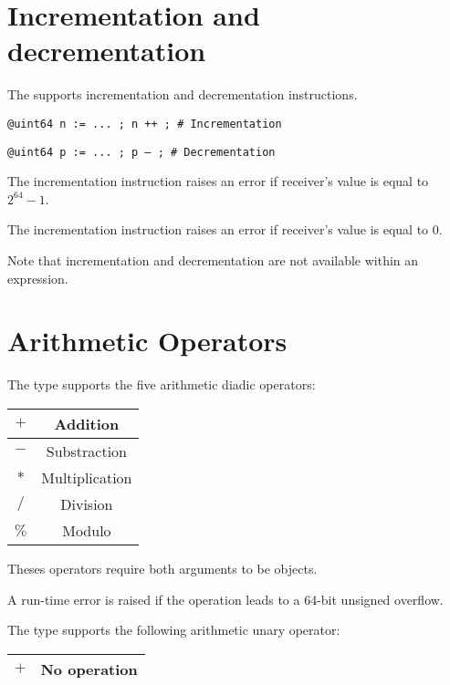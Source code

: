 \section{Incrementation and decrementation}

The  supports incrementation and decrementation instructions.

\texttt{@uint64 n := ... ; n ++ ; \# Incrementation}

\texttt{@uint64 p := ... ; p -- ; \# Decrementation}\newline

The incrementation instruction raises an error if receiver's value is equal to $2^{64}-1$.\newline

The incrementation instruction raises an error if receiver's value is equal to 0.\newline

Note that incrementation and decrementation are not available within an expression.




\section{Arithmetic Operators}

The  type supports the five arithmetic diadic operators:\newline

\begin{tabular}{|c|c|}
\hline
$+$ & Addition \\
\hline
$-$ & Substraction \\
\hline
$*$ & Multiplication \\
\hline
$/$ & Division \\
\hline
$\%$ & Modulo \\
\hline
\end{tabular}

Theses operators require both arguments to be  objects.\newline

A run-time error is raised if the operation leads to a 64-bit unsigned overflow.

The  type supports the following arithmetic unary operator:\newline

\begin{tabular}{|c|c|}
\hline
$+$ & No operation \\
\hline
\end{tabular}

